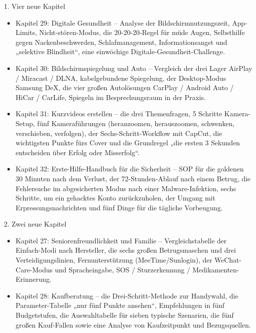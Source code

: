 
1. Vier neue Kapitel

\begin{itemize}
  \item Kapitel 29: Digitale Gesundheit – Analyse der Bildschirmnutzungszeit, App-Limits, Nicht-stören-Modus, die 20-20-20-Regel für müde Augen, Selbsthilfe gegen Nackenbeschwerden, Schlafmanagement, Informationsangst und „selektive Blindheit“, eine einwöchige Digitale-Gesundheit-Challenge.
  \item Kapitel 30: Bildschirmspiegelung und Auto – Vergleich der drei Lager AirPlay / Miracast / DLNA, kabelgebundene Spiegelung, der Desktop-Modus Samsung DeX, die vier großen Autolösungen CarPlay / Android Auto / HiCar / CarLife, Spiegeln im Besprechungsraum in der Praxis.
  \item Kapitel 31: Kurzvideos erstellen – die drei Themenfragen, 5 Schritte Kamera-Setup, fünf Kameraführungen (heranzoomen, herauszoomen, schwenken, verschieben, verfolgen), der Sechs-Schritt-Workflow mit CapCut, die wichtigsten Punkte fürs Cover und die Grundregel „die ersten 3 Sekunden entscheiden über Erfolg oder Misserfolg“.
  \item Kapitel 32: Erste-Hilfe-Handbuch für die Sicherheit – SOP für die goldenen 30 Minuten nach dem Verlust, der 72-Stunden-Ablauf nach einem Betrug, die Fehlersuche im abgesicherten Modus nach einer Malware-Infektion, sechs Schritte, um ein gehacktes Konto zurückzuholen, der Umgang mit Erpressungsnachrichten und fünf Dinge für die tägliche Vorbeugung.
\end{itemize}

2. Zwei neue Kapitel

\begin{itemize}
  \item Kapitel 27: Seniorenfreundlichkeit und Familie – Vergleichstabelle der Einfach-Modi nach Hersteller, die sechs großen Betrugsmaschen und drei Verteidigungslinien, Fernunterstützung (MeeTime/Sunlogin), der WeChat-Care-Modus und Spracheingabe, SOS / Sturzerkennung / Medikamenten-Erinnerung.
  \item Kapitel 28: Kaufberatung – die Drei-Schritt-Methode zur Handywahl, die Parameter-Tabelle „nur fünf Punkte ansehen“, Empfehlungen in fünf Budgetstufen, die Auswahltabelle für sieben typische Szenarien, die fünf großen Kauf-Fallen sowie eine Analyse von Kaufzeitpunkt und Bezugsquellen.
\end{itemize}

